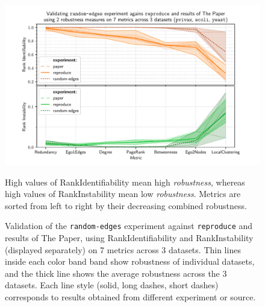 \begin{figure}
    \includegraphics[width=\linewidth]{plot_random_edges.pdf}
    \caption{Validation of the \texttt{random-edges} experiment against \texttt{reproduce} and results of The Paper, using RankIdentifiability and RankInstability (displayed separately) on 7 metrics across 3 datasets.
    Thin lines inside each color band band show robustness of individual datasets, and the thick line shows the average robustness across the 3 datasets.
    Each line style (solid, long dashes, short dashes) corresponds to results obtained from different experiment or source.}
    \label{fig:plot_random_edges}
    \footnotesize
    \begin{flushleft}
        High values of RankIdentifiability mean high \textsl{robustness}, whereas high values of RankInstability mean low \textsl{robustness}.
        Metrics are sorted from left to right by their decreasing combined robustness.
    \end{flushleft}
\end{figure}
